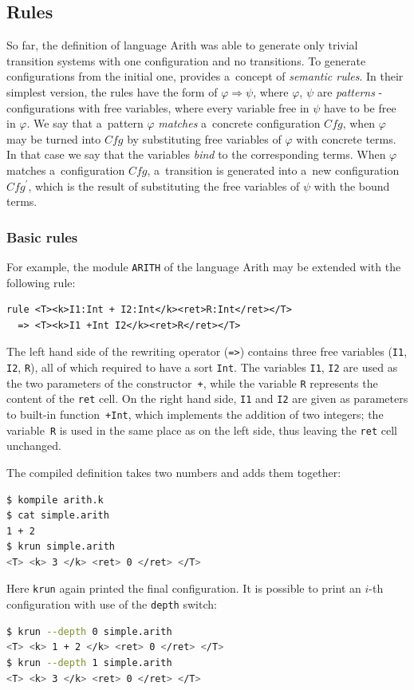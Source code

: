 \documentclass{fithesis3}
\newcommand{\var}[1]{\mathit{#1}\xspace}
\newcommand{\krun}{\texttt{krun}\xspace}
\begin{document}
\subsection{Rules}
So far, the definition of language Arith was able to generate only trivial transition systems with one configuration and no transitions. To generate configurations from the initial one, \K provides a~concept of \textit{semantic rules}. In their simplest version, the rules have the form of $\varphi \Rightarrow \psi$, where $\varphi$, $\psi$ are \textit{patterns} - configurations with free variables, where every variable free in $\psi$ have to be free in $\varphi$. We say that a~pattern $\varphi$ \textit{matches} a~concrete configuration $\var{Cfg}$, when $\varphi$ may be turned into $\var{Cfg}$ by substituting free variables of $\varphi$ with concrete terms. In that case we say that the variables \textit{bind} to the corresponding terms. When $\varphi$ matches a~configuration $\var{Cfg}$, a~transition is generated into a~new configuration $\var{Cfg^\prime}$, which is the result of substituting the free variables of $\psi$ with the bound terms.

\subsubsection{Basic rules}
For example, the module \texttt{ARITH} of the language Arith may be extended with the following rule:
\begin{lstlisting}
rule <T><k>I1:Int + I2:Int</k><ret>R:Int</ret></T> 
  => <T><k>I1 +Int I2</k><ret>R</ret></T>
\end{lstlisting}
The left hand side of the rewriting operator (\lstinline{=>}{}) contains three free variables (\texttt{I1}, \texttt{I2}, \texttt{R}), all of which required to have a sort \texttt{Int}. The variables \texttt{I1}, \texttt{I2} are used as the two parameters of the constructor~\lstinline{+}{}, while the variable \texttt{R} represents the content of the \texttt{ret} cell. On the right hand side, \texttt{I1} and \texttt{I2} are given as parameters to built-in function~\lstinline{+Int}{}, which implements the addition of two integers; the variable~\texttt{R} is used in the same place as on the left side, thus leaving the \texttt{ret} cell unchanged.

The compiled definition takes two numbers and adds them together:
\begin{lstlisting}[language=bash]
$ kompile arith.k
$ cat simple.arith
1 + 2
$ krun simple.arith
<T> <k> 3 </k> <ret> 0 </ret> </T>
\end{lstlisting}
Here \krun again printed the final configuration. It is possible to print an $i$-th configuration with use of the \texttt{depth} switch:
\begin{lstlisting}[language=bash]
$ krun --depth 0 simple.arith
<T> <k> 1 + 2 </k> <ret> 0 </ret> </T>
$ krun --depth 1 simple.arith
<T> <k> 3 </k> <ret> 0 </ret> </T>
\end{lstlisting}
\end{document}
